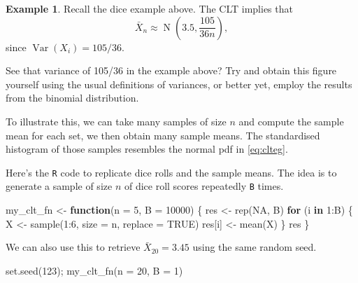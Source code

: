 \documentclass[
]{book}
\newenvironment{Shaded}{\begin{snugshade}}{\end{snugshade}}
\newcommand{\AttributeTok}[1]{\textcolor[rgb]{0.77,0.63,0.00}{#1}}
\newcommand{\ConstantTok}[1]{\textcolor[rgb]{0.00,0.00,0.00}{#1}}
\newcommand{\ControlFlowTok}[1]{\textcolor[rgb]{0.13,0.29,0.53}{\textbf{#1}}}
\newcommand{\DecValTok}[1]{\textcolor[rgb]{0.00,0.00,0.81}{#1}}
\newcommand{\FunctionTok}[1]{\textcolor[rgb]{0.00,0.00,0.00}{#1}}
\newcommand{\NormalTok}[1]{#1}
\newcommand{\OtherTok}[1]{\textcolor[rgb]{0.56,0.35,0.01}{#1}}
\newcommand{\SpecialCharTok}[1]{\textcolor[rgb]{0.00,0.00,0.00}{#1}}
\DeclareMathOperator{\Var}{Var}
\DeclareMathOperator{\N}{N}
\theoremstyle{definition}
\theoremstyle{definition}
\newtheorem{example}{Example}[chapter]
\theoremstyle{definition}
\theoremstyle{definition}
\theoremstyle{remark}
\begin{document}
\begin{example}
Recall the dice example above.
The CLT implies that
\begin{equation}
\bar X_n \approx \N\left(3.5, \frac{105}{36n}\right), \label{eq:clteg}
\end{equation}
since \(\Var(X_i)=105/36\).
\end{example}

See that variance of 105/36 in the example above? Try and obtain this figure yourself using the usual definitions of variances, or better yet, employ the results from the binomial distribution.

To illustrate this, we can take many samples of size \(n\) and compute the sample mean for each
set, we then obtain many sample means.
The standardised histogram of those samples resembles the normal pdf in \eqref{eq:clteg}.

Here's the \texttt{R} code to replicate dice rolls and the sample means.
The idea is to generate a sample of size \(n\) of dice roll scores repeatedly \texttt{B} times.

\begin{Shaded}
\begin{Highlighting}[]
\NormalTok{my\_clt\_fn }\OtherTok{\textless{}{-}} \ControlFlowTok{function}\NormalTok{(}\AttributeTok{n =} \DecValTok{5}\NormalTok{, }\AttributeTok{B =} \DecValTok{10000}\NormalTok{) \{}
\NormalTok{  res }\OtherTok{\textless{}{-}} \FunctionTok{rep}\NormalTok{(}\ConstantTok{NA}\NormalTok{, B)}
  \ControlFlowTok{for}\NormalTok{ (i }\ControlFlowTok{in} \DecValTok{1}\SpecialCharTok{:}\NormalTok{B) \{}
\NormalTok{    X }\OtherTok{\textless{}{-}} \FunctionTok{sample}\NormalTok{(}\DecValTok{1}\SpecialCharTok{:}\DecValTok{6}\NormalTok{, }\AttributeTok{size =}\NormalTok{ n, }\AttributeTok{replace =} \ConstantTok{TRUE}\NormalTok{)}
\NormalTok{    res[i] }\OtherTok{\textless{}{-}} \FunctionTok{mean}\NormalTok{(X)}
\NormalTok{  \}}
\NormalTok{  res}
\NormalTok{\}}
\end{Highlighting}
\end{Shaded}

We can also use this to retrieve \(\bar X_{20}=3.45\) using the same random seed.

\begin{Shaded}
\begin{Highlighting}[]
\FunctionTok{set.seed}\NormalTok{(}\DecValTok{123}\NormalTok{); }\FunctionTok{my\_clt\_fn}\NormalTok{(}\AttributeTok{n =} \DecValTok{20}\NormalTok{, }\AttributeTok{B =} \DecValTok{1}\NormalTok{)}
\end{Highlighting}
\end{Shaded}
\end{document}
